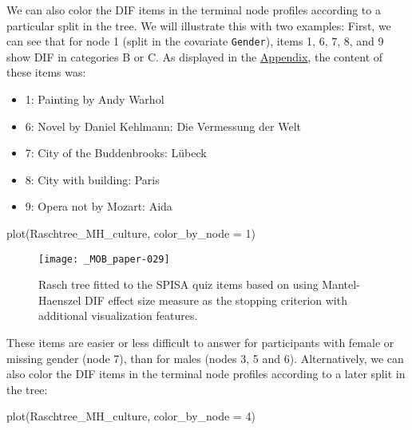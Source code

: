 \documentclass[doc,floatsintext,natbib]{apa7}
\begin{document}
We can also color the DIF items in the terminal node profiles according to a particular split in the tree. We will illustrate this with two examples: First, we can see that for node 1 (split in the covariate \texttt{Gender}), items 1, 6, 7, 8, and 9 show DIF in categories B or C. As displayed in the \hyperref[sec:AppendixA]{Appendix}, the content of these items was:

\begin{itemize}
\setlength\itemsep{0em}
\item 1: Painting by Andy Warhol
\item 6: Novel by Daniel Kehlmann: Die Vermessung der Welt
\item 7: City of the Buddenbrooks: Lübeck
\item 8: City with building: Paris
\item 9: Opera not by Mozart: Aida
\end{itemize}

\begin{Schunk}
\begin{Sinput}
 plot(Raschtree_MH_culture, color_by_node = 1)
\end{Sinput}
\end{Schunk}

\begin{figure}%
\caption{Rasch tree fitted to the SPISA quiz items based on using Mantel-Haenszel DIF effect size measure as the stopping criterion with additional visualization features.}
\texttt{[image: \_MOB\_paper-029]}
\label{fig:MHtree3}
\end{figure}%

These items are %
easier or less difficult to answer for participants with female or missing gender (node 7), than for males (nodes 3, 5 and 6). Alternatively, we can also color the DIF items in the terminal node profiles according to a later split in the tree:





\begin{Schunk}
\begin{Sinput}
 plot(Raschtree_MH_culture, color_by_node = 4)
\end{Sinput}
\end{Schunk}
\end{document}
